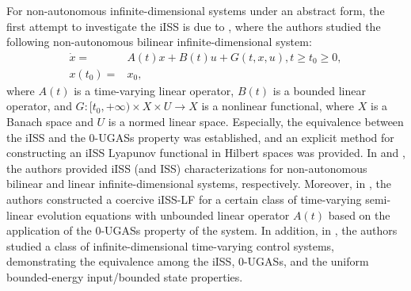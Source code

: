 \documentclass[onecolumn]{autart}
\newenvironment{proof of Prop.ODE}{{\it Proof of Proposition~\ref{Prop.ODE}:\enspace}}{\hfill $\blacksquare$\par}
\newenvironment{proof of PDE}{{\it Proof of Proposition \ref{Prop.8}:\enspace}}{\hfill $\blacksquare$\par}
\begin{document}
For non-autonomous infinite-dimensional systems under an abstract form,   the  first   attempt to   investigate  the iISS is due to \cite{damak2021input}, where the authors  {studied} the following non-autonomous bilinear infinite-dimensional system:
\begin{align*}
	\dot{x} =& A(t)x + B(t)u + G(t, x, u),  t \geq t_0 \geq 0, \\
	x(t_0) =& x_0,
\end{align*}
where %
$A(t)$  is a time-varying linear operator, $B(t)$ is a bounded linear operator,
and $G:[t_0,+\infty)\times X\times U\rightarrow X$ is a nonlinear functional, where  $X$ is a {Banach space} and $U$ is a  normed linear space. Especially,  the equivalence between the iISS and the  0-UGASs property    was established, and  an explicit method for constructing an iISS Lyapunov functional   in Hilbert spaces was provided.
In \cite{damak2023input} {and \cite{Heni:2025}, the authors provided   iISS  (and ISS) characterizations}  for non-autonomous {bilinear and linear   infinite-dimensional   systems, respectively.  Moreover,   in \cite{Heni:2025}, the authors   constructed a coercive  iISS-LF  for a certain class of time-varying semi-linear evolution equations with unbounded linear operator $A(t)$ based on the  application of the 0-UGASs property of the system. In addition,
in}    \cite{JoseL2023}, the authors studied a class of infinite-dimensional time-varying control systems, demonstrating the equivalence among the iISS, %
0-UGASs, and the uniform bounded-energy input/bounded state  properties.
\end{document}
